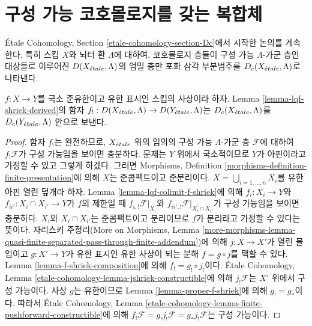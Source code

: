 \section{구성 가능 코호몰로지를 갖는 복합체}
\label{section-Dc}

\noindent
\'Etale Cohomology, Section
\ref{etale-cohomology-section-Dc}에서 시작한 논의를 계속한다.
특히 스킴 $X$와 뇌터 환 $\Lambda$에 대하여,
코호몰로지 층들이 구성 가능 $\Lambda$-가군 층인 대상들로 이루어진
$D(X_{\acute{e}tale}, \Lambda)$의 엄밀 충만 포화 삼각 부분범주를
$D_c(X_{\acute{e}tale}, \Lambda)$로 나타낸다.

\begin{lemma}
\label{lemma-qf-f-shriek-constructible}
$f : X \to Y$를 국소 준유한이고 유한 표시인 스킴의 사상이라 하자.
Lemma \ref{lemma-lqf-shriek-derived}의 함자
$f_! : D(X_{\acute{e}tale}, \Lambda) \to D(Y_{\acute{e}tale}, \Lambda)$는
$D_c(X_{\acute{e}tale}, \Lambda)$를 $D_c(Y_{\acute{e}tale}, \Lambda)$ 안으로 보낸다.
\end{lemma}

\begin{proof}
함자 $f_!$는 완전하므로, $X_{\acute{e}tale}$ 위의 임의의 구성 가능
$\Lambda$-가군 층 $\mathcal{F}$에 대하여
$f_!\mathcal{F}$가 구성 가능임을 보이면 충분하다.
문제는 $Y$ 위에서 국소적이므로 $Y$가 아핀이라고 가정할 수 있고
그렇게 하겠다. 그러면 Morphisms, Definition
\ref{morphisms-definition-finite-presentation}에 의해
$X$는 준콤팩트이고 준분리이다.
$X = \bigcup_{i = 1, \ldots, n} X_i$를 유한 아핀 열린 덮개라 하자.
Lemma \ref{lemma-lqf-colimit-f-shriek}에 의해
$f_i : X_i \to Y$와 $f_{ii'} : X_i \cap X_{i'} \to Y$가 $f$의
제한일 때 $f_{i, !}\mathcal{F}|_{X_i}$와
$f_{ii', !}\mathcal{F}|_{X_i \cap X_{i'}}$가 구성 가능임을 보이면
충분하다. $X_i$와 $X_i \cap X_{i'}$는 준콤팩트이고 분리이므로
$f$가 분리라고 가정할 수 있다는 뜻이다.
자리스키 주정리(More on Morphisms, Lemma
\ref{more-morphisms-lemma-quasi-finite-separated-pass-through-finite-addendum})에
의해 $j : X \to X'$가 열린 몰입이고
$g : X' \to Y$가 유한 표시인 유한 사상이 되는 분해
$f = g \circ j$를 택할 수 있다.
Lemma \ref{lemma-f-shriek-composition}에 의해
$f_! = g_! \circ j_!$이다. \'Etale Cohomology, Lemma
\ref{etale-cohomology-lemma-jshriek-constructible}에 의해
$j_!\mathcal{F}$는 $X'$ 위에서 구성 가능이다.
사상 $g$는 유한이므로 Lemma \ref{lemma-proper-f-shriek}에 의해
$g_! = g_*$이다. 따라서 \'Etale Cohomology, Lemma
\ref{etale-cohomology-lemma-finite-pushforward-constructible}에 의해
$f_!\mathcal{F} = g_!j_!\mathcal{F} = g_*j_!\mathcal{F}$는
구성 가능이다.
\end{proof}

